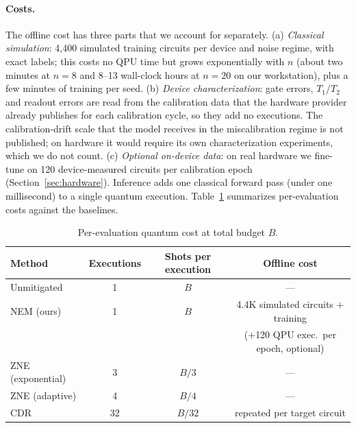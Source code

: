 \documentclass[11pt]{article}
\begin{document}
\paragraph{Costs.}
The offline cost has three parts that we account for separately. (a) \emph{Classical simulation}: 4{,}400 simulated training circuits per device and noise regime, with exact labels; this costs no QPU time but grows exponentially with $n$ (about two minutes at $n{=}8$ and 8--13 wall-clock hours at $n{=}20$ on our workstation), plus a few minutes of training per seed. (b) \emph{Device characterization}: gate errors, $T_1/T_2$ and readout errors are read from the calibration data that the hardware provider already publishes for each calibration cycle, so they add no executions. The calibration-drift scale that the model receives in the miscalibration regime is not published; on hardware it would require its own characterization experiments, which we do not count. (c) \emph{Optional on-device data}: on real hardware we fine-tune on 120 device-measured circuits per calibration epoch (Section~\ref{sec:hardware}). Inference adds one classical forward pass (under one millisecond) to a single quantum execution. Table~\ref{tab:cost} summarizes per-evaluation costs against the baselines.

\begin{table}[t]
\caption{Per-evaluation quantum cost at total budget $B$.}
\label{tab:cost}
\centering
\small
\begin{tabular}{lccc}
\toprule
Method & Executions & Shots per execution & Offline cost \\
\midrule
Unmitigated & 1 & $B$ & --- \\
NEM (ours) & 1 & $B$ & 4.4K simulated circuits $+$ training \\
 & & & ($+$120 QPU exec.\ per epoch, optional) \\
ZNE (exponential) & 3 & $B/3$ & --- \\
ZNE (adaptive) & 4 & $B/4$ & --- \\
CDR & 32 & $B/32$ & repeated per target circuit \\
\bottomrule
\end{tabular}
\end{table}
\end{document}
